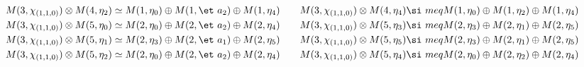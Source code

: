 \begin{align*}
M(3,\chi_{(1,1,0)}) &\otimes M(4,\eta_{2}) \simeq M(1,\eta_{0}) \oplus M(1,\et\
a_{2}) \oplus M(1,\eta_{4}) &&& M(3,\chi_{(1,1,0)}) &\otimes M(4,\eta_{4}) \si\
meq M(1,\eta_{0}) \oplus M(1,\eta_{2}) \oplus M(1,\eta_{4})\\
M(3,\chi_{(1,1,0)}) &\otimes M(5,\eta_{0}) \simeq M(2,\eta_{0}) \oplus M(2,\et\
a_{2}) \oplus M(2,\eta_{4}) &&& M(3,\chi_{(1,1,0)}) &\otimes M(5,\eta_{3}) \si\
meq M(2,\eta_{3}) \oplus M(2,\eta_{1}) \oplus M(2,\eta_{5})\\
M(3,\chi_{(1,1,0)}) &\otimes M(5,\eta_{1}) \simeq M(2,\eta_{3}) \oplus M(2,\et\
a_{1}) \oplus M(2,\eta_{5}) &&& M(3,\chi_{(1,1,0)}) &\otimes M(5,\eta_{5}) \si\
meq M(2,\eta_{3}) \oplus M(2,\eta_{1}) \oplus M(2,\eta_{5})\\
M(3,\chi_{(1,1,0)}) &\otimes M(5,\eta_{2}) \simeq M(2,\eta_{0}) \oplus M(2,\et\
a_{2}) \oplus M(2,\eta_{4}) &&& M(3,\chi_{(1,1,0)}) &\otimes M(5,\eta_{4}) \si\
meq M(2,\eta_{0}) \oplus M(2,\eta_{2}) \oplus M(2,\eta_{4})\\
\end{align*}

